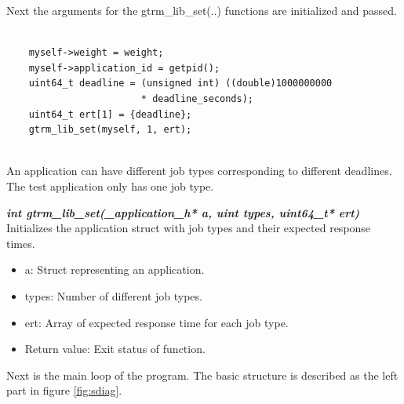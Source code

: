 \documentclass[nobiblatex]{LTHthesis}
\begin{document}
Next the arguments for the  	gtrm\_lib\_set(..) functions are initialized and passed.
\begin{verbatim}	

	myself->weight = weight;
	myself->application_id = getpid();
	uint64_t deadline = (unsigned int) ((double)1000000000 
                        * deadline_seconds);
	uint64_t ert[1] = {deadline};
	gtrm_lib_set(myself, 1, ert);
	
\end{verbatim}
An application can have different job types corresponding to different deadlines. The test application only has one job type. 

\begin{framed}
	\begin{flushleft}		
		\emph{\textbf{{int gtrm\_lib\_set(\_application\_h* a, uint types, uint64\_t* ert)}}}
		Initializes the application struct with job types and their expected response times.
		\begin{itemize}
		\item a: Struct representing an application.
		\item types: Number of different job types.
		\item ert: Array of expected response time for each job type.
		\item Return value: Exit status of function.
\end{itemize}
	\end{flushleft}
\end{framed}



Next is the main loop of the program. The basic structure is described as the left part in figure \ref{fig:sdiag}.
\end{document}

